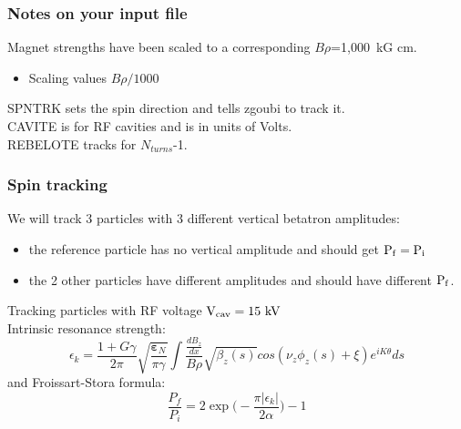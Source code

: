 \documentclass{beamer}
\begin{document}
\begin{frame}
\frametitle{Notes on your input file}
Magnet strengths have been scaled to a corresponding $B\rho$=1,000~kG cm.
\begin{itemize}
\item Scaling values $B\rho/1000$
\end{itemize}
SPNTRK sets the spin direction and tells zgoubi to track it.\\
CAVITE is for RF cavities and is in units of Volts.\\
REBELOTE tracks for $N_{turns}$-1.\\


\end{frame}

\begin{frame}
\frametitle{Spin tracking}

We will track 3 particles with 3 different vertical betatron amplitudes:
\begin{itemize}
\item the reference particle has no vertical amplitude and should get $\rm P_f=P_i$
\item the 2 other particles have different amplitudes and should have different $\rm P_f$.
\end{itemize}
Tracking particles with RF voltage $\rm V_{cav}=15~kV$\\

Intrinsic resonance strength:
\small{
\begin{equation}
\epsilon_k=\frac{1+G\gamma}{2\pi}\sqrt{\frac{\pmb{\varepsilon}_N}{\pi\gamma}}\int\frac{\frac{dB_z}{dx}}{B\rho}\sqrt{\beta_z(s)}cos(\nu_z\phi_z(s)+\xi)e^{iK\theta}ds
\end{equation}
}
\normalsize
and
Froissart-Stora formula:
\small{
\begin{equation}
\frac{P_f}{P_i}=2\exp\bigg(-\frac{\pi|\epsilon_k|}{2\alpha}\bigg)-1
\end{equation}
}

\end{frame}
\end{document}
